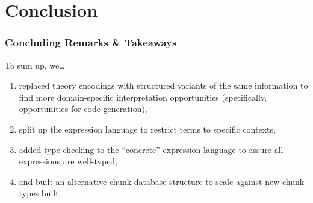 \documentclass[xcolor={dvipsnames}]{beamer}
\begin{document}
\section{Conclusion}

\begin{frame}
  \frametitle{Concluding Remarks \& Takeaways}

  To sum up, we\ldots{}
  \begin{enumerate}
    \item replaced theory encodings with structured variants of the same
          information to find more domain-specific interpretation opportunities
          (specifically, opportunities for code generation),
    \item split up the expression language to restrict terms to specific contexts,
    \item added type-checking to the ``concrete'' expression language to assure
          all expressions are well-typed,
    \item and built an alternative chunk database structure to scale against new
          chunk types built.
  \end{enumerate}
\end{frame}
\end{document}
